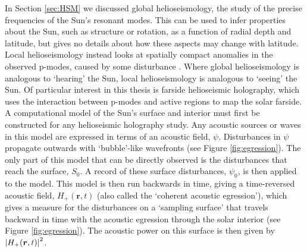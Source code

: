 \documentclass[11pt,a4paper,onecolumn]{report}
\DeclarePairedDelimiter{\abs}{\lvert}{\rvert}
\begin{document}
In Section \ref{sec:HSM} we discussed global helioseismology, the
study of the precise frequencies of the Sun's resonant modes. This can be used
to infer properties about the Sun, such as structure or rotation, as a function
of radial depth and latitude, but gives no details about how these aspects may
change with latitude. Local helioseismology instead looks at
spatially compact anomalies in the observed p-modes, caused by some disturbance
\citep{braun_absorption_1988}. Where global helioseismology is analogous to
`hearing' the Sun, local helioseismology is analogous to `seeing' the Sun. Of
particular interest in this thesis is farside helioseismic holography, which
uses the interaction between p-modes and active regions to map the solar farside. \\




A computational model of the Sun's surface and interior must first be constructed for
any helioseismic holography study. Any acoustic sources or waves in this model
are expressed in terms of an acoustic field, \(\psi\). Disturbances in \(\psi\)
propagate outwards with `bubble'-like wavefronts (see Figure
\ref{fig:egression}). The only part of this model that can be directly observed
is the disturbances that reach the surface, \(S_0\). A record of these surface
disturbances, \(\psi_0\), is then applied to the model. This model is then run
backwards in time, giving a time-reversed acoustic field, \(H_+(\bm{r}, t)\)
(also called the `coherent acoustic egression'), which gives a measure for the
disturbances on a `sampling surface' that travels backward in time with the
acoustic egression through the solar interior (see Figure \ref{fig:egression}).
The acoustic power on this surface is then given by \(\abs*{H_+(\bm{r},
t)}^2\).\\
\end{document}
